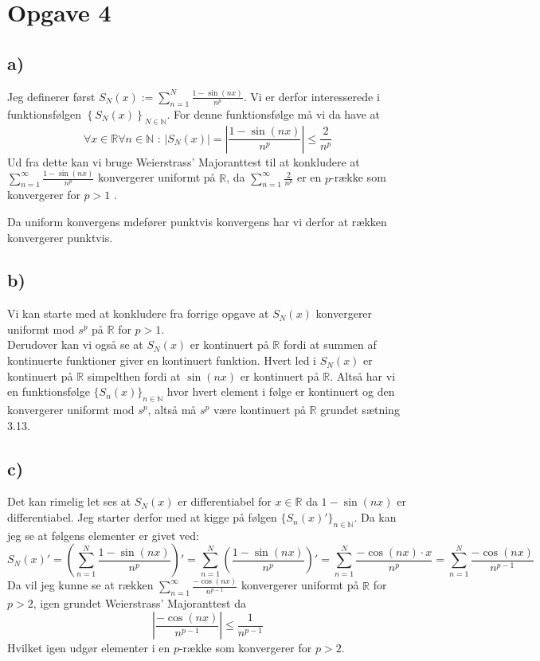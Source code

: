 \documentclass{article}
\newcommand{\m}[1]{\mathbb{#1}}
\newcommand{\mR}{\m{R}}
\newcommand{\mN}{\m{N}}
\newcommand{\abs}[1]{\left| #1\right|}
\newcommand{\lr}[1]{\left( #1\right)}
\newcommand{\lrc}[1]{\left\{ #1\right\}}
\begin{document}
\section*{Opgave 4}
\subsection*{a)}
Jeg definerer først $S_N(x) := \sum_{n=1}^N \frac{1 - \sin(nx)}{n^p}$.
Vi er derfor interesserede i funktionsfølgen $\lrc{S_N(x)}_{N \in \mN}$.
For denne funktionsfølge må vi da have at 
\[
    \forall x \in \mR \forall n \in \mN \text{ : } |S_N(x)| = \abs{\frac{1-\sin(nx)}{n^p}} \le \frac{2}{n^p}
\]
Ud fra dette kan vi bruge Weierstrass' Majoranttest\cite[sætning 3.24]{an1} til at konkludere at 
$\sum_{n=1}^{\infty} \frac{1 - \sin(nx)}{n^p}$ konvergerer uniformt på $\mR$, 
da $\sum_{n=1}^{\infty} \frac{2}{n^p}$ er en $p$-række som konvergerer for $p>1$ \cite[eksempel 2.23]{an1}.

Da uniform konvergens mdefører punktvis konvergens har vi derfor at rækken konvergerer punktvis.


\subsection*{b)}
Vi kan starte med at konkludere fra forrige opgave at $S_N(x)$ konvergerer uniformt mod $s^p$ på $\mR$ for $p > 1$. \\
Derudover kan vi også se at $S_N(x)$ er kontinuert på $\mR$ fordi at 
summen af kontinuerte funktioner giver en kontinuert funktion. Hvert led i
$S_N(x)$ er kontinuert på $\mR$ simpelthen fordi at $\sin(nx)$ er kontinuert på $\mR$.
Altså har vi en funktionsfølge $\{S_n(x)\}_{n \in \mN}$ hvor hvert element i følge er kontinuert
og den konvergerer uniformt mod $s^p$, altså må $s^p$ være kontinuert på $\mR$ grundet sætning 3.13\cite{an1}.

\subsection*{c)}
Det kan rimelig let ses at $S_N(x)$ er differentiabel for $x \in \mR$ da $1-\sin(nx)$ er differentiabel.
Jeg starter derfor med at kigge på følgen $\{S_n(x)'\}_{n \in \mN}$.
Da kan jeg se at følgens elementer er givet ved:
\[
    S_N(x)' = \lr{\sum_{n=1}^{N} \frac{1-\sin(nx)}{n^p}}' 
    = \sum_{n=1}^{N} \lr{\frac{1-\sin(nx)}{n^p}}'
    = \sum_{n=1}^{N} \frac{-\cos(nx)\cdot x}{n^p}
    = \sum_{n=1}^{N} \frac{-\cos(nx)}{n^{p-1}}
\]
Da vil jeg kunne se at rækken $\sum_{n=1}^{\infty} \frac{-\cos(nx)}{n^{p-1}}$ konvergerer uniformt på $\mR$ for $p>2$,
igen grundet Weierstrass' Majoranttest\cite[sætning 3.24]{an1} da 
\[
    \abs{\frac{-\cos(nx)}{n^{p-1}}} \le \frac{1}{n^{p-1}}
\]
Hvilket igen udgør elementer i en $p$-række som konvergerer for $p>2$.
\end{document}
